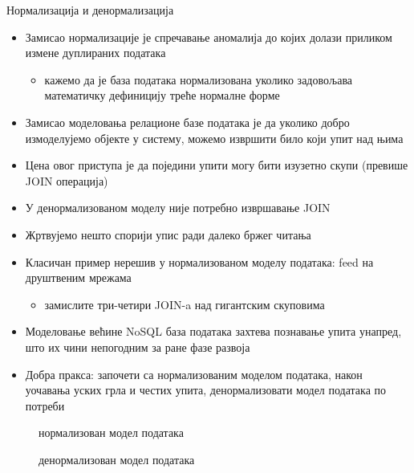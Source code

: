 \documentclass{beamer}
\begin{document}
    \begin{frame}[allowframebreaks]{Нормализација и денормализација}
        \begin{itemize}
            \item Замисао нормализације је спречавање аномалија до којих долази приликом измене дуплираних података
            \begin{itemize}
                \item кажемо да је база података нормализована уколико задовољава математичку дефиницију треће нормалне форме
            \end{itemize} 
            \item Замисао моделовања релационе базе података је да уколико добро измоделујемо објекте у систему, можемо извршити било који упит над њима
            \item Цена овог приступа је да поједини упити могу бити изузетно скупи (превише JOIN операција)
            \item У денормализованом моделу није потребно извршавање JOIN
        \end{itemize}
        
        \framebreak
        
        \begin{itemize}
            \item Жртвујемо нешто спорији упис ради далеко бржег читања
            \item Класичан пример нерешив у нормализованом моделу података: feed на друштвеним мрежама
            \begin{itemize}
                \item замислите три-четири JOIN-a над гигантским скуповима
            \end{itemize}
            \item Моделовање већине NoSQL база података захтева познавање упита унапред, што их чини непогодним за ране фазе развоја
            \item Добра пракса: започети са нормализованим моделом података, након уочавања уских грла и честих упита, денормализовати модел података по потреби
        \end{itemize}
        
        \framebreak
        
        \begin{figure}
            \centering
            \caption{нормализован модел података}
            \label{fig:orm}
        \end{figure}
        
        \framebreak
        
        \begin{figure}
            \centering
            \caption{денормализован модел података}
            \label{fig:orm}
        \end{figure}
    \end{frame}
    
\end{document}
